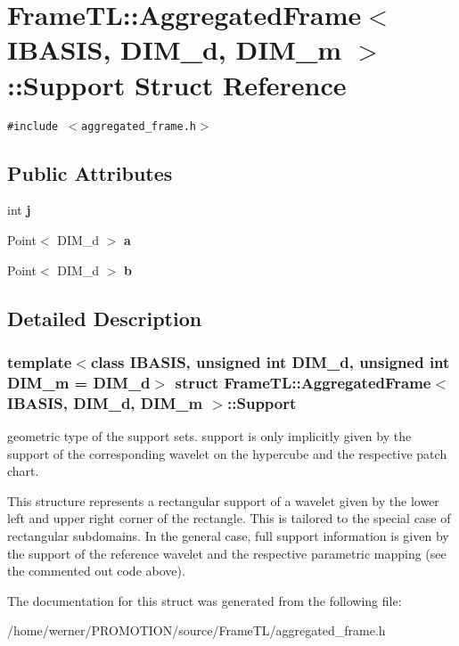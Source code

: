 \hypertarget{structFrameTL_1_1AggregatedFrame_1_1Support}{
\section{FrameTL::AggregatedFrame$<$ IBASIS, DIM\_\-d, DIM\_\-m $>$::Support Struct Reference}
\label{structFrameTL_1_1AggregatedFrame_1_1Support}
}
{\tt \#include $<$aggregated\_\-frame.h$>$}

\subsection*{Public Attributes}
\begin{CompactItemize}
\item 
\hypertarget{structFrameTL_1_1AggregatedFrame_1_1Support_77cdbbe4b8fb406ff826123241033ab1}{
int \textbf{j}}
\label{structFrameTL_1_1AggregatedFrame_1_1Support_77cdbbe4b8fb406ff826123241033ab1}

\item 
\hypertarget{structFrameTL_1_1AggregatedFrame_1_1Support_92176a8c1fbcfd1981385da1d01175ed}{
Point$<$ DIM\_\-d $>$ \textbf{a}}
\label{structFrameTL_1_1AggregatedFrame_1_1Support_92176a8c1fbcfd1981385da1d01175ed}

\item 
\hypertarget{structFrameTL_1_1AggregatedFrame_1_1Support_eb9ec5b1dd43d7175d61a7a4d1cb3e94}{
Point$<$ DIM\_\-d $>$ \textbf{b}}
\label{structFrameTL_1_1AggregatedFrame_1_1Support_eb9ec5b1dd43d7175d61a7a4d1cb3e94}

\end{CompactItemize}


\subsection{Detailed Description}
\subsubsection*{template$<$class IBASIS, unsigned int DIM\_\-d, unsigned int DIM\_\-m = DIM\_\-d$>$ struct FrameTL::AggregatedFrame$<$ IBASIS, DIM\_\-d, DIM\_\-m $>$::Support}

geometric type of the support sets. support is only implicitly given by the support of the corresponding wavelet on the hypercube and the respective patch chart.

This structure represents a rectangular support of a wavelet given by the lower left and upper right corner of the rectangle. This is tailored to the special case of rectangular subdomains. In the general case, full support information is given by the support of the reference wavelet and the respective parametric mapping (see the commented out code above). 

The documentation for this struct was generated from the following file:\begin{CompactItemize}
\item 
/home/werner/PROMOTION/source/FrameTL/aggregated\_\-frame.h\end{CompactItemize}
